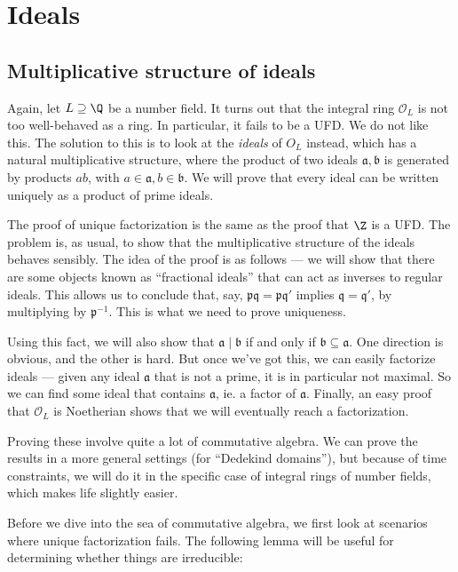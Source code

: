 \documentclass[a4paper]{article}
\begin{document}
\section{Ideals}
\subsection{Multiplicative structure of ideals}
Again, let $L \supseteq \Q$ be a number field. It turns out that the integral ring $\mathcal{O}_L$ is not too well-behaved as a ring. In particular, it fails to be a UFD. We do not like this. The solution to this is to look at the \emph{ideals} of $O_L$ instead, which has a natural multiplicative structure, where the product of two ideals $\mathfrak{a}, \mathfrak{b}$ is generated by products $ab$, with $a \in \mathfrak{a}, b \in \mathfrak{b}$. We will prove that every ideal can be written uniquely as a product of prime ideals.

The proof of unique factorization is the same as the proof that $\Z$ is a UFD. The problem is, as usual, to show that the multiplicative structure of the ideals behaves sensibly. The idea of the proof is as follows --- we will show that there are some objects known as ``fractional ideals'' that can act as inverses to regular ideals. This allows us to conclude that, say, $\mathfrak{p}\mathfrak{q} = \mathfrak{p} \mathfrak{q}'$ implies $\mathfrak{q} = \mathfrak{q}'$, by multiplying by $\mathfrak{p}^{-1}$. This is what we need to prove uniqueness.

Using this fact, we will also show that $\mathfrak{a} \mid \mathfrak{b}$ if and only if $\mathfrak{b} \subseteq \mathfrak{a}$. One direction is obvious, and the other is hard. But once we've got this, we can easily factorize ideals --- given any ideal $\mathfrak{a}$ that is not a prime, it is in particular not maximal. So we can find some ideal that contains $\mathfrak{a}$, ie. a factor of $\mathfrak{a}$. Finally, an easy proof that $\mathcal{O}_L$ is Noetherian shows that we will eventually reach a factorization.

Proving these involve quite a lot of commutative algebra. We can prove the results in a more general settings (for ``Dedekind domains''), but because of time constraints, we will do it in the specific case of integral rings of number fields, which makes life slightly easier.

Before we dive into the sea of commutative algebra, we first look at scenarios where unique factorization fails. The following lemma will be useful for determining whether things are irreducible:
\end{document}
